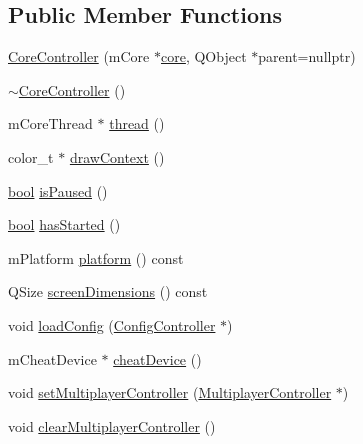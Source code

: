 \subsection*{Public Member Functions}
\begin{DoxyCompactItemize}
\item 
\mbox{\hyperlink{class_q_g_b_a_1_1_core_controller_a6e4a1c279b76e4693ee7860c2cf9f2ed}{Core\+Controller}} (m\+Core $\ast$\mbox{\hyperlink{libretro_8c_a0fa20029c1b76361c88b7c2b13e89aff}{core}}, Q\+Object $\ast$parent=nullptr)
\item 
\mbox{\hyperlink{class_q_g_b_a_1_1_core_controller_a334c26059c56bff3eb22059450e9c7a9}{$\sim$\+Core\+Controller}} ()
\item 
m\+Core\+Thread $\ast$ \mbox{\hyperlink{class_q_g_b_a_1_1_core_controller_a151b422f712a0f690484334d2c936605}{thread}} ()
\item 
color\+\_\+t $\ast$ \mbox{\hyperlink{class_q_g_b_a_1_1_core_controller_a75b38518510f7aa4ba69bfe4a2a6552b}{draw\+Context}} ()
\item 
\mbox{\hyperlink{libretro_8h_a4a26dcae73fb7e1528214a068aca317e}{bool}} \mbox{\hyperlink{class_q_g_b_a_1_1_core_controller_a4b93ae5c212269bbda95efdb07d849e5}{is\+Paused}} ()
\item 
\mbox{\hyperlink{libretro_8h_a4a26dcae73fb7e1528214a068aca317e}{bool}} \mbox{\hyperlink{class_q_g_b_a_1_1_core_controller_a2ca73e2c7b5111edcf3b137651b3cff4}{has\+Started}} ()
\item 
m\+Platform \mbox{\hyperlink{class_q_g_b_a_1_1_core_controller_a340f633528b35be81f7803c78dfd63d4}{platform}} () const
\item 
Q\+Size \mbox{\hyperlink{class_q_g_b_a_1_1_core_controller_a8f1f4a7dc619a569cf6546e5e8bb4ee5}{screen\+Dimensions}} () const
\item 
void \mbox{\hyperlink{class_q_g_b_a_1_1_core_controller_a9289bc6fcbd0674874ce011528dfd146}{load\+Config}} (\mbox{\hyperlink{class_q_g_b_a_1_1_config_controller}{Config\+Controller}} $\ast$)
\item 
m\+Cheat\+Device $\ast$ \mbox{\hyperlink{class_q_g_b_a_1_1_core_controller_aa0dc516043cdd3586765c7b27b79a85b}{cheat\+Device}} ()
\item 
void \mbox{\hyperlink{class_q_g_b_a_1_1_core_controller_a222d740640682346f2ee8725641727ee}{set\+Multiplayer\+Controller}} (\mbox{\hyperlink{class_q_g_b_a_1_1_multiplayer_controller}{Multiplayer\+Controller}} $\ast$)
\item 
void \mbox{\hyperlink{class_q_g_b_a_1_1_core_controller_a086e32f43e7e1bb5daada438af88017d}{clear\+Multiplayer\+Controller}} ()

\end{DoxyCompactItemize}
